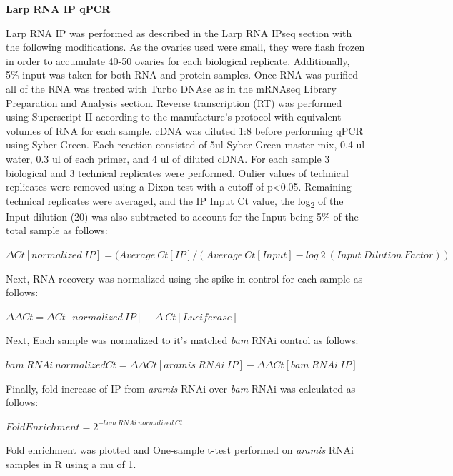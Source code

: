\documentclass[12pt,oneside]{reedthesis}
\begin{document}
\textbf{Larp RNA IP qPCR}

Larp RNA IP was performed as described in the Larp RNA IPseq section
with the following modifications. As the ovaries used were small, they
were flash frozen in order to accumulate 40-50 ovaries for each
biological replicate. Additionally, 5\% input was taken for both RNA and
protein samples. Once RNA was purified all of the RNA was treated with
Turbo DNAse as in the \underline{} mRNAseq Library Preparation and
Analysis section. Reverse transcription (RT) was performed using
Superscript II according to the manufacture's protocol with equivalent
volumes of RNA for each sample. cDNA was diluted 1:8 before performing
qPCR using Syber Green. Each reaction consisted of 5ul Syber Green
master mix, 0.4 ul water, 0.3 ul of each primer, and 4 ul of diluted
cDNA. For each sample 3 biological and 3 technical replicates were
performed. Oulier values of technical replicates were removed using a
Dixon test with a cutoff of p\textless0.05. Remaining technical replicates were
averaged, and the IP Input Ct value, the log\textsubscript{2} of the Input dilution
(20) was also subtracted to account for the Input being 5\% of the total
sample as follows:

\textbf{\hfill\break
}

\(\Delta Ct[normalized\ IP] = (Average\ Ct[IP]/(Average\ Ct[Input] - log~2~(Input\ Dilution\ Factor))\)

\textbf{\hfill\break
}

Next, RNA recovery was normalized using the spike-in control for each
sample as follows:

\textbf{\hfill\break
}

\(\Delta \Delta Ct = \Delta Ct[normalized\ IP]-\Delta\ Ct[Luciferase]\)

\textbf{\hfill\break
}

Next, Each sample was normalized to it's matched \emph{bam} RNAi control as
follows:

\textbf{\hfill\break
}

\(bam\ RNAi\ normalized Ct= \Delta \Delta Ct[aramis\ RNAi\ IP] - \Delta \Delta Ct[bam\ RNAi\ IP]\)

Finally, fold increase of IP from \emph{aramis} RNAi over \emph{bam} RNAi was
calculated as follows:

\textbf{\hfill\break
}

\(Fold Enrichment = 2^{-bam\ RNAi\ normalized\ Ct}\)

\textbf{\hfill\break
}

Fold enrichment was plotted and One-sample t-test performed on \emph{aramis}
RNAi samples in R using a mu of 1.
\end{document}
